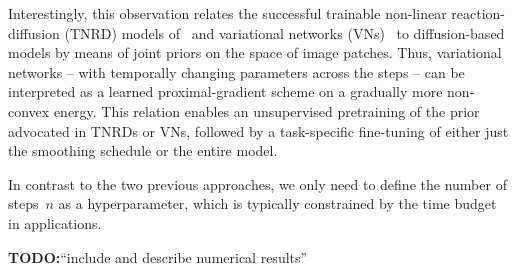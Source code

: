 \documentclass{article} %
\theoremstyle{plain}
\theoremstyle{definition}
\theoremstyle{remark}
\newcommand{\todo}[1]{{\color{red}\textbf{TODO:}``#1''}}
\newcommand{\prox}{\mathrm{prox}}
\begin{document}
Interestingly, this observation relates the successful trainable non-linear reaction-diffusion (TNRD) models of~\citet{ChPo16} and variational networks (VNs)~\citep{KoKl17,HaKl18,EfKo20} to diffusion-based models by means of joint priors on the space of image patches.
Thus, variational networks -- with temporally changing parameters across the steps -- can be interpreted as a learned proximal-gradient scheme on a gradually more non-convex energy.
This relation enables an unsupervised pretraining of the prior advocated in TNRDs or VNs, followed by a task-specific fine-tuning of either just the smoothing schedule or the entire model.

In contrast to the two previous approaches, we only need to define the number of steps~$n$ as a hyperparameter, which is typically constrained by the time budget in applications.

\todo{include and describe numerical results}




\end{document}
